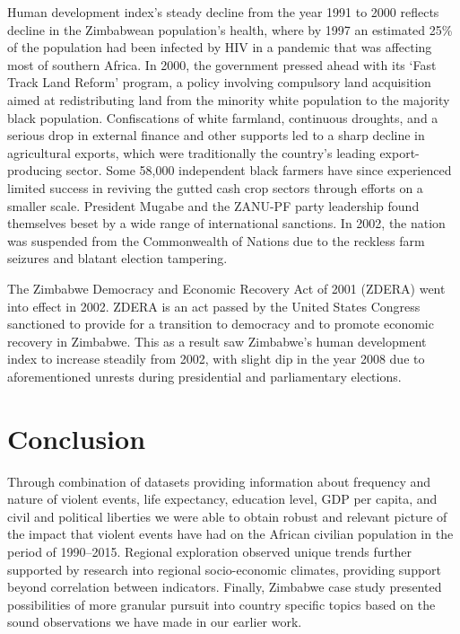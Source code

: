 \documentclass[a4paper,11pt]{article}
\begin{document}
Human development index’s steady decline from the year 1991 to 2000 reflects decline in the Zimbabwean population’s health, where by 1997 an estimated 25\% of the population had been infected by HIV in a pandemic that was affecting most of southern Africa. In 2000, the government pressed ahead with its ‘Fast Track Land Reform’ program, a policy involving compulsory land acquisition aimed at redistributing land from the minority white population to the majority black population. Confiscations of white farmland, continuous droughts, and a serious drop in external finance and other supports led to a sharp decline in agricultural exports, which were traditionally the country's leading export-producing sector. Some 58,000 independent black farmers have since experienced limited success in reviving the gutted cash crop sectors through efforts on a smaller scale. President Mugabe and the ZANU-PF party leadership found themselves beset by a wide range of international sanctions. In 2002, the nation was suspended from the Commonwealth of Nations due to the reckless farm seizures and blatant election tampering.

The Zimbabwe Democracy and Economic Recovery Act of 2001 (ZDERA) went into effect in 2002. ZDERA is an act passed by the United States Congress sanctioned to provide for a transition to democracy and to promote economic recovery in Zimbabwe. This as a result saw Zimbabwe’s human development index to increase steadily from 2002, with slight dip in the year 2008 due to aforementioned unrests during presidential and parliamentary elections.

\section{Conclusion}

Through combination of datasets providing information about frequency and nature of violent events, life expectancy, education level, GDP per capita, and civil and political liberties we were able to obtain robust and relevant picture of the impact that violent events have had on the African civilian population in the period of 1990--2015. Regional exploration observed unique trends further supported by research into regional socio-economic climates, providing support beyond correlation between indicators. Finally, Zimbabwe case study presented possibilities of more granular pursuit into country specific topics based on the sound observations we have made in our earlier work.
\end{document}
